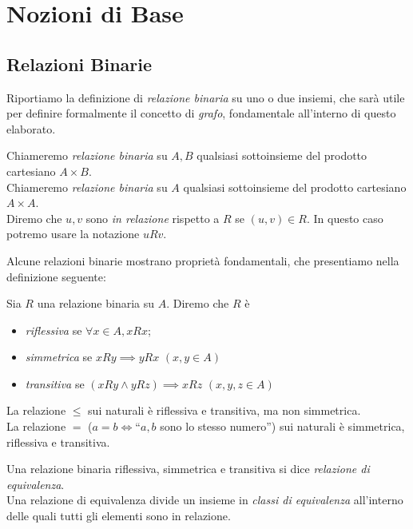 \section{Nozioni di Base}

\subsection{Relazioni Binarie}
Riportiamo la definizione di \emph{relazione binaria} su uno o due insiemi, che sarà utile per definire formalmente il concetto di \emph{grafo}, fondamentale all'interno di questo elaborato.
\begin{definition}
    Chiameremo \emph{relazione binaria} su $A,B$ qualsiasi sottoinsieme del prodotto cartesiano $A \times B$.\\
    Chiameremo \emph{relazione binaria} su $A$ qualsiasi sottoinsieme del prodotto cartesiano $A \times A$.\\
	Diremo che $u,v$ sono \emph{in relazione} rispetto a $R$ se $(u,v) \in R$. In questo caso potremo usare la notazione $u R v$.
\end{definition}
Alcune relazioni binarie mostrano proprietà fondamentali, che presentiamo nella definizione seguente:
\begin{definition}
    Sia $R$ una relazione binaria su $A$. Diremo che $R$ è
    \begin{itemize}
        \item \emph{riflessiva} se $\forall x \in A, x R x$;
        \item \emph{simmetrica} se $x R y \implies y R x \,\,(x,y \in A)$
        \item \emph{transitiva} se $(x R y \land y R z) \implies x R z \,\,(x,y,z \in A)$
    \end{itemize}
\end{definition}
\begin{example}
    La relazione $\leq$ sui naturali è riflessiva e transitiva, ma non simmetrica.\\
    La relazione $=$ ($a = b \iff $``$a,b$ sono lo stesso numero'') sui naturali è simmetrica, riflessiva e transitiva.
\end{example}
\begin{definition}
    Una relazione binaria riflessiva, simmetrica e transitiva si dice \emph{relazione di equivalenza}.\\
    Una relazione di equivalenza divide un insieme in \emph{classi di equivalenza} all'interno delle quali tutti gli elementi sono in relazione.
\end{definition}
